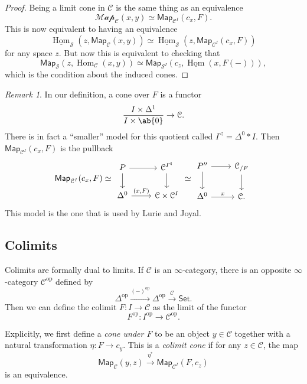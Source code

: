 \documentclass[10pt]{amsart}
\theoremstyle{definition}
\theoremstyle{remark}
\newtheorem{rmk}[thm]{Remark}
\theoremstyle{plain}
\theoremstyle{definition}
\theoremstyle{remark}
\newcommand{\mc}[1]{\mathcal{#1}}
\newcommand{\ms}[1]{\mathsf{#1}}
\newcommand{\ul}[1]{\underline{#1}}
\newcommand{\1}{\mathbf{1}}
\newcommand{\2}{\mathbf{2}}
\newcommand{\3}{\mathbf{3}}
\DeclareMathOperator{\Hom}{Hom}
\DeclareMathOperator{\op}{op}
\begin{document}
\begin{proof}
    Being a limit cone in $\mc{C}$ is the same thing as an equivalence
    \[ \mc{Map}_{\mc{C}}(x, y) \simeq \ms{Map}_{\mc{C}^I} (c_x, F). \]
    This is now equivalent to having an equivalence
    \[ \ul{\Hom}_{\mc{S}}(z, \ms{Map}_{\mc{C}}(x,y)) \simeq \ul{\Hom}_{\mc{S}}(z, \ms{Map}_{\mc{C}^I}(c_x, F)) \]
    for any space $z$. But now this is equivalent to checking that
    \[ \ms{Map}_{\mc{S}}(z, \Hom_{\mc{C}}(x,y)) \simeq \ms{Map}_{\mc{S}^I} (c_z, \ul{\Hom}(x, F(-))), \]
    which is the condition about the induced cones.
\end{proof}

\begin{rmk}
    In our definition, a cone over $F$ is a functor
    \[ \frac{I \times \Delta^1}{I \times \ab\{0\}} \to \mc{C}. \]
    There is in fact a ``smaller'' model for this quotient called $I^{\triangleleft} = \Delta^0 * I$.
    Then $\ms{Map}_{\mc{C}^I}(c_x, F)$ is the pullback
    \begin{equation*} \ms{Map}_{\mc{C}^I}(c_x, F) \simeq 
    \begin{tikzcd}
        P \ar{d} \ar{r} & \mc{C}^{I^{\triangleleft}} \ar{d} \\
        \Delta^0 \ar{r}{(x, F)} & \mc{C} \times \mc{C}^I 
    \end{tikzcd} \simeq
        \begin{tikzcd}
            P'' \ar{d} \ar{r} & \mc{C}_{/F} \ar{d} \\
            \Delta^0 \ar{r}{x} & \mc{C}.
        \end{tikzcd}
    \end{equation*}
    This model is the one that is used by Lurie and Joyal.
\end{rmk}


\subsection{Colimits}%
\label{sub:Colimits}

Colimits are formally dual to limits. If $\mc{C}$ is an $\infty$-category, there is an opposite $\infty$-category $\mc{C}^{\op}$ defined by
\[ \Delta^{\op} \xrightarrow{(-)^{\op}} \Delta^{\op} \xrightarrow{\mc{C}} \ms{Set}. \]
Then we can define the colimit $F \colon I \to \mc{C}$ as the limit of the functor
\[ F^{\op} \colon I^{\op} \to \mc{C}^{\op}. \]

Explicitly, we first define a \textit{cone under $F$} to be an object $y \in \mc{C}$ together with a natural transformation $\eta \colon F \to c_y$. This is a \textit{colimit cone} if for any $z \in \mc{C}$, the map
\[ \ms{Map}_{\mc{C}}(y, z) \xrightarrow{\eta^*} \ms{Map}_{\mc{C}^I} (F, c_z) \]
is an equivalence.
\end{document}

